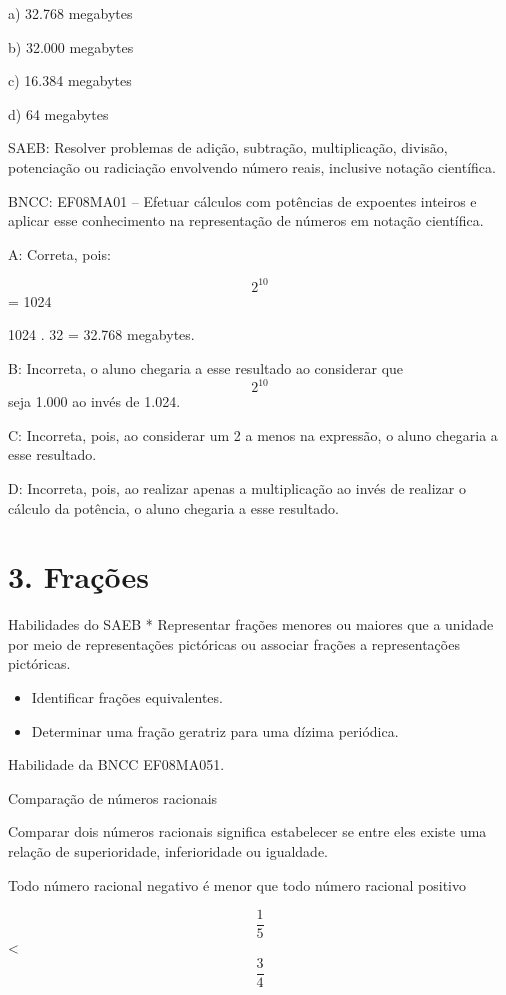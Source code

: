 a) 32.768 megabytes

b) 32.000 megabytes

c) 16.384 megabytes

d) 64 megabytes

SAEB: Resolver problemas de adição, subtração, multiplicação, divisão,
potenciação ou radiciação envolvendo número reais, inclusive notação
científica.

BNCC: EF08MA01 -- Efetuar cálculos com potências de expoentes inteiros e
aplicar esse conhecimento na representação de números em notação
científica.

A: Correta, pois:

\[2^10\] = 1024

1024 . 32 = 32.768 megabytes.

B: Incorreta, o aluno chegaria a esse resultado ao considerar que
\[2^{10}\] seja 1.000 ao invés de 1.024.

C: Incorreta, pois, ao considerar um 2 a menos na expressão, o aluno
chegaria a esse resultado.

D: Incorreta, pois, ao realizar apenas a multiplicação ao invés de
realizar o cálculo da potência, o aluno chegaria a esse resultado.

\hypertarget{frauxe7uxf5es}{%
\section{3. Frações}\label{frauxe7uxf5es}}

Habilidades do SAEB * Representar frações menores ou maiores que a
unidade por meio de representações pictóricas ou associar frações a
representações pictóricas.

\begin{itemize}
\item
  Identificar frações equivalentes.
\item
  Determinar uma fração geratriz para uma dízima periódica.
\end{itemize}

Habilidade da BNCC EF08MA051.

Comparação de números racionais

Comparar dois números racionais significa estabelecer se entre eles
existe uma relação de superioridade, inferioridade ou igualdade.

Todo número racional negativo é menor que todo número racional positivo

\[\frac{1}{5}\] \textless{} \[\frac{3}{4}\]

